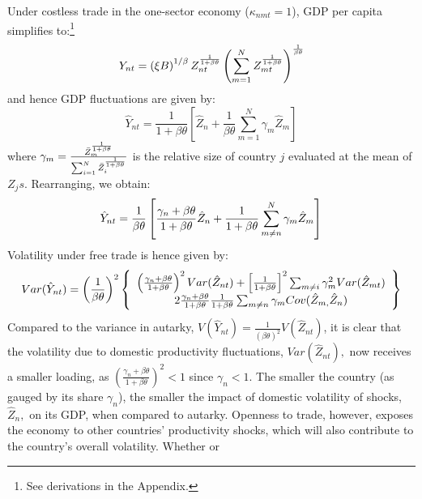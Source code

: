 \documentclass[12pt]{article}
\begin{document}
Under costless trade in the one-sector economy ($\kappa _{nmt}=1$), GDP per
capita simplifies to:\footnote{%
See derivations in the Appendix.} 
\begin{equation*}
Y_{nt}=\left( \xi B\right) ^{1/\beta }Z_{nt}^{\frac{1}{1+\beta \theta }%
}\left( \sum_{m=1}^{N}Z_{mt}^{\frac{1}{1+\beta \theta }}\right) ^{\frac{1}{%
\beta \theta }}
\end{equation*}%
and hence GDP fluctuations are given by: 
\begin{equation*}
\hat{Y}_{nt}=\frac{1}{1+\beta \theta }\left[ \hat{Z}_{n}+\frac{1}{\beta
\theta }\sum_{m=1}^{N}\gamma _{m}\hat{Z}_{m}\right]
\end{equation*}%
where $\gamma _{m}=\frac{\bar{Z}_{m}^{\frac{1}{1+\beta \theta }}}{%
\sum_{i=1}^{N}\bar{Z}_{i}^{\frac{1}{1+\beta \theta }}}$ is the relative size
of country $j$ evaluated at the mean of $Z_{j}s$. Rearranging, we obtain: 
\begin{equation}
\hat{Y}_{nt}=\frac{1}{\beta \theta }\left[ \frac{\gamma _{n}+\beta \theta }{%
1+\beta \theta }\hat{Z}_{n}+\frac{1}{1+\beta \theta }\sum_{m\neq
n}^{N}\gamma _{m}\hat{Z}_{m}\right]
\end{equation}%
Volatility under free trade is hence given by: 
\begin{equation}
Var(\hat{Y}_{nt})=\left( \frac{1}{\beta \theta }\right) ^{2}\left\{ 
\begin{array}{c}
\left( \frac{\gamma _{n}+\beta \theta }{1+\beta \theta }\right) ^{2}Var(\hat{%
Z}_{nt})+\left[ \frac{1}{1+\beta \theta }\right] ^{2}\sum_{m\neq i}\gamma
_{m}^{2}Var(\hat{Z}_{mt}) \\ 
2\frac{\gamma _{n}+\beta \theta }{1+\beta \theta }\frac{1}{1+\beta \theta }%
\sum_{m\neq n}\gamma _{m}Cov(\hat{Z}_{m,}\hat{Z}_{n})%
\end{array}%
\right\}
\end{equation}%
Compared to the variance in autarky, $V(\hat{Y}_{nt})=\frac{1}{\left( \beta
\theta \right) ^{2}}V(\hat{Z}_{nt})$, it is clear that the volatility due to
domestic productivity fluctuations, $Var(\hat{Z}_{nt}),$ now receives a
smaller loading, as $\left( \frac{\gamma _{n}+\beta \theta }{1+\beta \theta }%
\right) ^{2}<1$ since $\gamma _{n}<1.$ The smaller the country (as gauged by
its share $\gamma _{n}$), the smaller the impact of domestic volatility of
shocks, $\hat{Z}_{n},$ on its GDP, when compared to autarky. Openness to
trade, however, exposes the economy to other countries' productivity shocks,
which will also contribute to the country's overall volatility. Whether or
\end{document}
